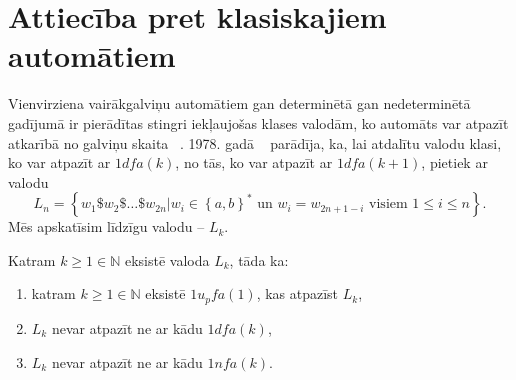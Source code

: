\documentclass{ludis}
\begin{document}
\section{Attiecība pret klasiskajiem automātiem}
Vienvirziena vairākgalviņu automātiem gan determinētā gan nedeterminētā gadījumā ir pierādītas stingri iekļaujošas klases valodām, ko automāts var atpazīt atkarībā no galviņu skaita ~\citep{Holzer2009,Yao1978}. 1978. gadā ~\citet{Yao1978} parādīja, ka, lai atdalītu valodu klasi, ko var atpazīt ar $1dfa(k)$, no tās, ko var atpazīt ar $1dfa(k+1)$, pietiek ar valodu
\[
	L_n = \left\{w_1\$w_2\$ \ldots \$w_{2n} | w_i \in \left\{a,b\right\}^* \textrm{ un } w_i = w_{2n+1−i} \textrm{ visiem } 1 \leq i \leq n \right\}.
\]
Mēs apskatīsim līdzīgu valodu -- $L_k$.
\begin{teorema}
Katram $k \geq 1 \in \mathbb{N}$ eksistē valoda $L_k$, tāda ka:
\begin{enumerate}[label={(\arabic*)}]
	\item katram $k \geq 1 \in \mathbb{N}$ eksistē $1u_pfa(1)$, kas atpazīst $L_k$,
	\item $L_k$ nevar atpazīt ne ar kādu $1dfa(k)$,
	\item $L_k$ nevar atpazīt ne ar kādu $1nfa(k)$.
\end{enumerate}
\end{teorema}
\end{document}
